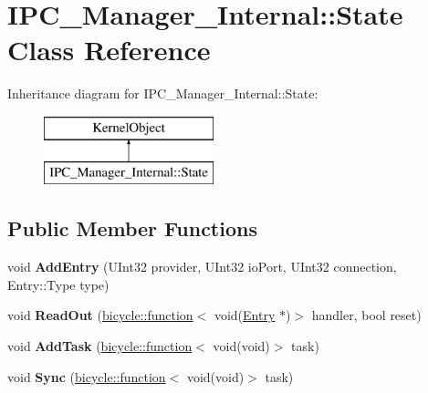 \hypertarget{class_i_p_c___manager___internal_1_1_state}{}\section{I\+P\+C\+\_\+\+Manager\+\_\+\+Internal\+:\+:State Class Reference}
\label{class_i_p_c___manager___internal_1_1_state}
Inheritance diagram for I\+P\+C\+\_\+\+Manager\+\_\+\+Internal\+:\+:State\+:\begin{figure}[H]
\begin{center}
\leavevmode
\includegraphics[height=2.000000cm]{class_i_p_c___manager___internal_1_1_state}
\end{center}
\end{figure}
\subsection*{Public Member Functions}
\begin{DoxyCompactItemize}
\item 
\mbox{\label{class_i_p_c___manager___internal_1_1_state_a8dedc93359ff2927c42f552a95bd0ff7}} 
void {\bfseries Add\+Entry} (U\+Int32 provider, U\+Int32 io\+Port, U\+Int32 connection, Entry\+::\+Type type)
\item 
\mbox{\label{class_i_p_c___manager___internal_1_1_state_acfd817713cbfa09a3c85db639fa2defb}} 
void {\bfseries Read\+Out} (\hyperlink{classbicycle_1_1function}{bicycle\+::function}$<$ void(\hyperlink{class_i_p_c___manager___internal_1_1_entry}{Entry} $\ast$)$>$ handler, bool reset)
\item 
\mbox{\label{class_i_p_c___manager___internal_1_1_state_a6d4e462220dbd928e06c16b7d7b0a479}} 
void {\bfseries Add\+Task} (\hyperlink{classbicycle_1_1function}{bicycle\+::function}$<$ void(void)$>$ task)
\item 
\mbox{\label{class_i_p_c___manager___internal_1_1_state_a6d47cfa1d4ca91594b80d53758d2b6d1}} 
void {\bfseries Sync} (\hyperlink{classbicycle_1_1function}{bicycle\+::function}$<$ void(void)$>$ task)
\end{DoxyCompactItemize}
